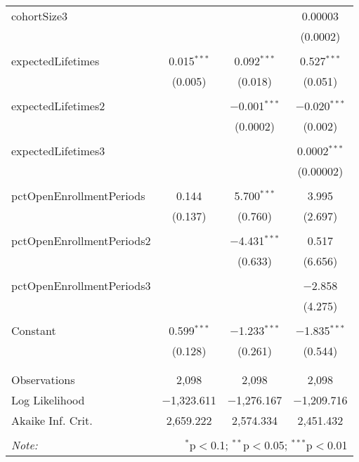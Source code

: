 \begin{table}[!htbp]
\begin{tabular}{@{\extracolsep{5pt}}lccc}
 cohortSize3 &  &  & 0.00003 \\ 
  &  &  & (0.0002) \\ 
  & & & \\ 
 expectedLifetimes & 0.015$^{***}$ & 0.092$^{***}$ & 0.527$^{***}$ \\ 
  & (0.005) & (0.018) & (0.051) \\ 
  & & & \\ 
 expectedLifetimes2 &  & $-$0.001$^{***}$ & $-$0.020$^{***}$ \\ 
  &  & (0.0002) & (0.002) \\ 
  & & & \\ 
 expectedLifetimes3 &  &  & 0.0002$^{***}$ \\ 
  &  &  & (0.00002) \\ 
  & & & \\ 
 pctOpenEnrollmentPeriods & 0.144 & 5.700$^{***}$ & 3.995 \\ 
  & (0.137) & (0.760) & (2.697) \\ 
  & & & \\ 
 pctOpenEnrollmentPeriods2 &  & $-$4.431$^{***}$ & 0.517 \\ 
  &  & (0.633) & (6.656) \\ 
  & & & \\ 
 pctOpenEnrollmentPeriods3 &  &  & $-$2.858 \\ 
  &  &  & (4.275) \\ 
  & & & \\ 
 Constant & 0.599$^{***}$ & $-$1.233$^{***}$ & $-$1.835$^{***}$ \\ 
  & (0.128) & (0.261) & (0.544) \\ 
  & & & \\ 
\hline \\[-1.8ex] 
Observations & 2,098 & 2,098 & 2,098 \\ 
Log Likelihood & $-$1,323.611 & $-$1,276.167 & $-$1,209.716 \\ 
Akaike Inf. Crit. & 2,659.222 & 2,574.334 & 2,451.432 \\ 
\hline 
\hline \\[-1.8ex] 
\textit{Note:}  & \multicolumn{3}{r}{$^{*}$p$<$0.1; $^{**}$p$<$0.05; $^{***}$p$<$0.01} \\ 
\end{tabular} 
\end{table}  

